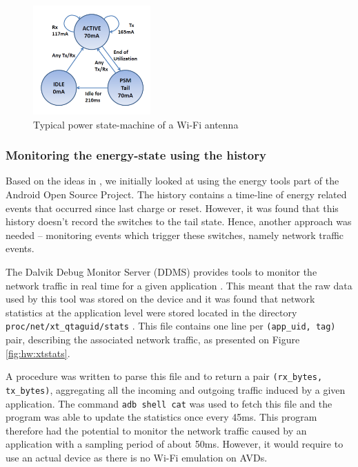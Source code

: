 \begin{figure}
\centering
\includegraphics[width=0.4\textwidth]{figures/wifi_statemachine.png}
\caption{Typical power state-machine of a Wi-Fi antenna \cite{Ding:2013:CMI:2465529.2466586}}
\label{fig:hw:statemachine}
\vspace {-0.32in}
\end{figure}

\subsubsection{Monitoring the energy-state using the \batterystats{} 
history}

Based on the ideas in \cite{petra}, we initially looked at using the 
energy tools part of the Android Open Source Project. The 
\batterystats{} history contains a time-line of energy related events 
that occurred since last charge or reset. However, it was found that 
this history doesn't record the switches to the tail state. Hence, 
another approach was needed -- monitoring events which trigger these 
switches, namely network traffic events.

The Dalvik Debug Monitor Server (DDMS) provides tools to monitor the 
network traffic in real time for a given application \cite{ddmstrafic}. 
This meant that the raw data used by this tool was stored on the device 
and it was found that network statistics at the application level were 
stored located in the directory \texttt{proc/net/xt\_qtaguid/stats} 
\cite{netxtqtaguid}. This file contains one line per \texttt{(app\_uid, 
tag)} pair, describing the associated network traffic, as presented on 
Figure \ref{fig:hw:xtstats}.

A \python{} procedure was written to parse this file and to return a 
pair \texttt{(rx\_bytes, tx\_bytes)}, aggregating all the incoming and 
outgoing traffic induced by a given application. The command \texttt{adb 
shell cat} was used to fetch this file and the program was able to 
update the statistics once every 45ms. This program therefore had the 
potential to monitor the network traffic caused by an application with a 
sampling period of about 50ms. However, it would require to use an 
actual device as there is no Wi-Fi emulation on AVDs.

